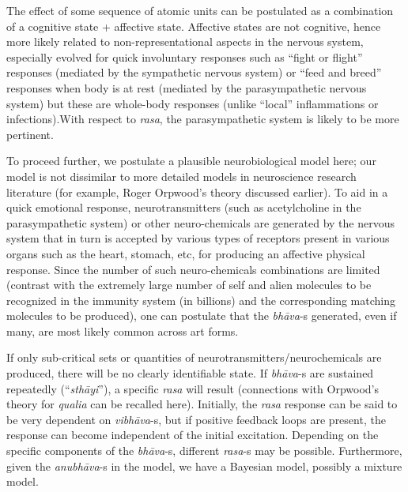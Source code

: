 The effect of some sequence of atomic units can be postulated as a combination of a cognitive state + affective state. Affective states are not cognitive, hence more likely related to non-representational aspects in the nervous system, especially evolved for quick involuntary responses such as “fight or flight” responses (mediated by the sympathetic nervous system) or “feed and breed” responses when body is at rest (mediated by the parasympathetic nervous system) but these are whole-body responses (unlike “local” inflammations or infections).\break With respect to \textsl{rasa}, the parasympathetic system is likely to be more pertinent. 

To proceed further, we postulate a plausible neurobiological model here; our model is not dissimilar to more detailed models in neuroscience research literature (for example, Roger Orpwood’s theory discussed earlier). To aid in a quick emotional response, neurotransmitters (such as acetylcholine in the parasympathetic system) or other neuro-chemicals are generated by the nervous system that in turn is accepted by various types of receptors present in various organs such as the heart, stomach, etc, for producing an affective physical response. Since the number of such neuro-chemicals combinations are limited (contrast with the extremely large number of self and alien molecules to be recognized in the immunity system (in billions) and the corresponding matching molecules to be produced), one can postulate that the \textsl{bhāva}-s generated, even if many, are most likely common across art forms. 

If only sub-critical sets or quantities of neurotransmitters/neuro\-chemicals are produced, there will be no clearly identifiable state. If \textsl{bhāva}-s are sustained repeatedly (“\textsl{sthāyi}”), a specific \textsl{rasa} will result (connections with Orpwood’s theory for \textsl{qualia} can be recalled here). Initially, the \textsl{rasa} response can be said to be very dependent on \textsl{vibhāva}-s, but if positive feedback loops are present, the response can become independent of the initial excitation. Depending on the specific components of the \textsl{bhāva}-s, different \textsl{rasa}-s may be possible. Furthermore, given the \textsl{anubhāva}-s in the model, we have a Bayesian model, possibly a mixture model.

